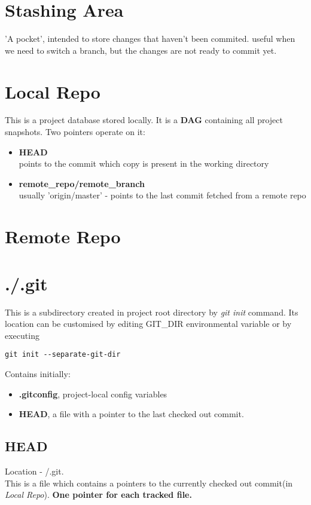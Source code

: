 \documentclass{report}
\begin{document}
\chapter{Stashing Area}
'A pocket', intended to store changes that haven't been commited. useful when we need to switch a branch, but the changes are not ready to commit yet.


 \chapter{Local Repo}	
This is a project database stored locally. It is a \textbf{DAG} containing all project snapshots. Two pointers operate on it:
\begin{itemize}
	\item \textbf{HEAD}\\
		points to the commit which copy is present in the working directory
	\item \textbf{remote\_repo/remote\_branch}\\
		usually 'origin/master' - points to the last commit fetched from a remote repo 
\end{itemize}


\chapter{Remote Repo}



\chapter{./.git}
This is a subdirectory created in project root directory by \textit{git init} command.  Its location can be customised by editing 
GIT\_DIR environmental variable or by executing
\begin{verbatim}
git init --separate-git-dir
\end{verbatim}
Contains initially:
\begin{itemize}
	\item \textbf{.gitconfig}, project-local config variables
	\item \textbf{HEAD}, a file with a pointer to the last checked out commit.
\end{itemize}


\section{HEAD}
Location - /.git.\\
This is a file which contains a pointers to the currently checked out commit(in \textit{Local Repo}). \textbf{One pointer for each tracked file.}
\end{document}
